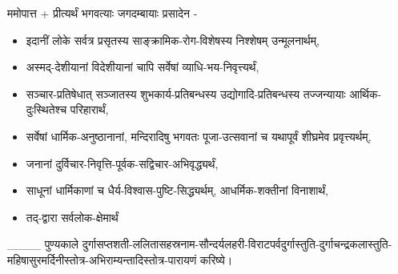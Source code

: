\setcounter{page}{0}
\sectionmark{\mbox{}}
\renewcommand{\chaptermark}[1]{%
\markboth{\large #1}{}}
\begin{center}

ममोपात्त + प्रीत्यर्थं भगवत्याः जगदम्बायाः प्रसादेन -
\begin{itemize}\addtolength{\itemsep}{-1ex}
\item इदानीं लोके सर्वत्र प्रसृतस्य साङ्क्रामिक-रोग-विशेषस्य निश्शेषम् उन्मूलनार्थम्,
\item अस्मद्-देशीयानां विदेशीयानां चापि सर्वेषां व्याधि-भय-निवृत्त्यर्थं,
\item सञ्चार-प्रतिषेधात् सञ्जातस्य शुभकार्य-प्रतिबन्धस्य उद्योगादि-प्रतिबन्धस्य तज्जन्यायाः आर्थिक-दुःस्थितेश्च  परिहारार्थं,
\item सर्वेषां धार्मिक-अनुष्ठानानां, मन्दिरादिषु भगवतः पूजा-उत्सवानां च यथापूर्वं शीघ्रमेव प्रवृत्त्यर्थम्,
\item जनानां दुर्विचार-निवृत्ति-पूर्वक-सद्विचार-अभिवृद्ध्यर्थं,
\item साधूनां धार्मिकाणां च धैर्य-विश्वास-पुष्टि-सिद्ध्यर्थम्, आधर्मिक-शक्तीनां विनाशार्थं,
\item तद्-द्वारा सर्वलोक-क्षेमार्थं
\end{itemize}
\_\_\_\_ पुण्यकाले 
दुर्गासप्तशती-ललितासहस्रनाम-सौन्दर्यलहरी-विराटपर्वदुर्गास्तुति-दुर्गाचन्द्रकलास्तुति-महिषासुरमर्दिनीस्तोत्र-अभिराम्यन्तादिस्तोत्र-पारायणं करिष्ये।








\closesection
\end{center}
